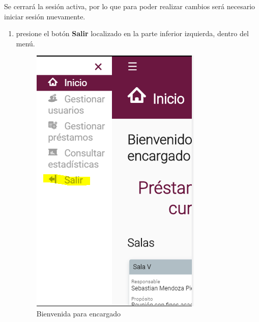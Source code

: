 Se cerrará la sesión activa, por lo que para poder realizar
cambios será necesario iniciar sesión nuevamente.
\begin{enumerate}
	\item presione el botón \textbf{Salir} localizado
		en la parte inferior izquierda, dentro del menú.
		
		\begin{figure}[hbtp]
		
		\includegraphics[scale=0.3]{images/InterfazMovil/IUGS10_logoutEncargado.png}
		\caption{Bienvenida para encargado}
	\end{figure}
		
\end{enumerate}

	